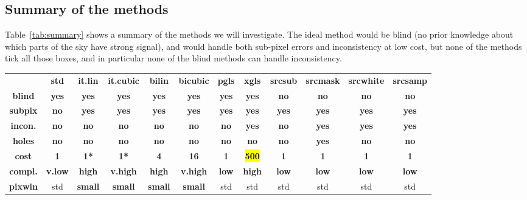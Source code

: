 \documentclass{article}
\DeclareRobustCommand{\hlblack}[1]{{\sethlcolor{black}\hl{#1}}}
\newcommand{\good}[1]{{\color{deepgreen}\textbf{#1}}}
\newcommand{\bad}[1]{{\color{red}\textbf{#1}}}
\newcommand{\terrible}[1]{{\color{red}\textbf{\hlblack{#1}}}}
\newcommand{\medi}[1]{{\color{orange}\textbf{#1}}}
\newcommand{\mixed}[1]{{\color{blue}\textbf{#1}}}
\newcommand{\neutral}[1]{#1}
\begin{document}
\subsection{Summary of the methods}
Table~\ref{tab:summary} shows a summary of the methods we will investigate. The ideal method would be
blind (no prior knowledge about which parts of the sky have strong signal),
and would handle both sub-pixel errors and inconsistency at low cost, but none of the methods
tick all those boxes, and in particular none of the blind methods can handle inconsistency.

\begin{table}
	\centering
	\hspace*{-5mm}
	\begin{tabular}{cccccccccccc}
			&
			\bf std &
			\bf it.lin &
			\bf it.cubic &
			\bf bilin &
			\bf bicubic &
			\bf pgls &
			\bf xgls &
			\bf srcsub &
			\bf srcmask &
			\bf srcwhite &
			\bf srcsamp
		\\
			\bf blind &
			\good{yes} &
			\good{yes} &
			\good{yes} &
			\good{yes} &
			\good{yes} &
			\good{yes} &
			\good{yes} &
			\bad{no} &
			\bad{no} &
			\bad{no} &
			\bad{no}
		\\
			\bf subpix & 
			\bad{no} &
			\good{yes} &
			\good{yes} &
			\good{yes} &
			\good{yes} &
			\good{yes} &
			\good{yes} &
			\good{yes} &
			\good{yes} &
			\good{yes} &
			\good{yes}
		\\
			\bf incon. &
			\bad{no} &
			\bad{no} &
			\bad{no} &
			\bad{no} &
			\bad{no} &
			\bad{no} &
			\good{yes} &
			\bad{no} &
			\good{yes} &
			\good{yes} &
			\good{yes}
		\\
			\bf holes &
			\good{no} &
			\good{no} &
			\good{no} &
			\good{no} &
			\good{no} &
			\good{no} &
			\good{no} &
			\good{no} &
			\bad{yes} &
			\good{no} &
			\good{no}
		\\
			\bf cost &
			\good{1} &
			\good{1*} &
			\good{1*} &
			\bad{4} &
			\bad{16} &
			\good{1} &
			\terrible{500} &
			\good{1} &
			\good{1} &
			\good{1} &
			\good{1}
		\\
			\bf compl. &
			\good{v.low} &
			\medi{high} &
			\bad{v.high} &
			\medi{high} &
			\bad{v.high} &
			\good{low} &
			\medi{high} &
			\good{low} &
			\good{low} &
			\good{low} &
			\good{low}
		\\
			\bf pixwin &
			\neutral{std} &
			\mixed{small} &
			\mixed{small} &
			\mixed{small} &
			\mixed{small} &
			\neutral{std} &
			\neutral{std} &
			\neutral{std} &
			\neutral{std} &
			\neutral{std} &
			\neutral{std}

\end{tabular}
\end{table}
\end{document}
